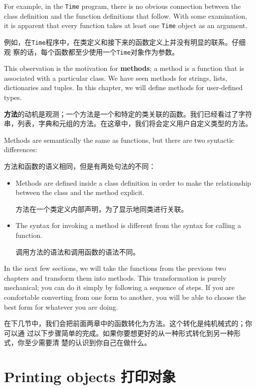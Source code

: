 \documentclass[10pt]{book}
\begin{document}
\begin{CJK}{UTF8}{gbsn}
For example, in the {\tt Time} program, there is no obvious
connection between the class definition and the function definitions
that follow.  With some examination, it is apparent that every function
takes at least one {\tt Time} object as an argument.

例如，在{\tt Time}程序中，在类定义和接下来的函数定义上并没有明显的联系。仔细观
察的话，每个函数都至少使用一个{\tt Time}对象作为参数。

This observation is the motivation for {\bf methods}; a method is
a function that is associated with a particular class.
We have seen methods for strings, lists, dictionaries and tuples.
In this chapter, we will define methods for user-defined types.

{\bf 方法}的动机是观测；一个方法是一个和特定的类关联的函数。我们已经看过了字符串，列表，字典和元组的方法。在这章中，我们将会定义用户自定义类型的方法。

Methods are semantically the same as functions, but there are
two syntactic differences:

方法和函数的语义相同，但是有两处句法的不同：

\begin{itemize}

\item Methods are defined inside a class definition in order
to make the relationship between the class and the method explicit.

方法在一个类定义内部声明，为了显示地同类进行关联。

\item The syntax for invoking a method is different from the
syntax for calling a function.

调用方法的语法和调用函数的语法不同。

\end{itemize}

In the next few sections, we will take the functions from the previous
two chapters and transform them into methods.  This transformation is
purely mechanical; you can do it simply by following a sequence of
steps.  If you are comfortable converting from one form to another,
you will be able to choose the best form for whatever you are doing.

在下几节中，我们会把前面两章中的函数转化为方法。这个转化是纯机械式的；你可以通
过以下步骤简单的完成。如果你要想更好的从一种形式转化到另一种形式，你至少需要清
楚的认识到你自己在做什么。


\section{Printing objects 打印对象}


\end{CJK}
\end{document}
